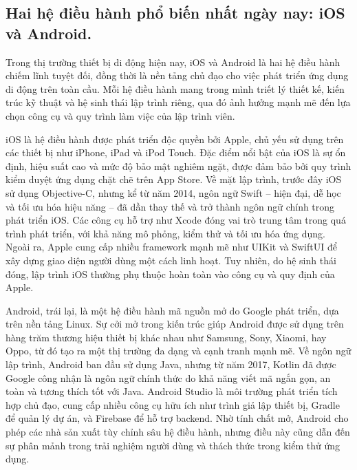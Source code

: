 \subsection{Hai hệ điều hành phổ biến nhất ngày nay: iOS và Android.}
\renewcommand{\labelitemi}{--}   
\begin{flushleft}
  \hspace*{0.8cm}Trong thị trường thiết bị di động hiện nay, iOS và Android là hai hệ điều hành chiếm lĩnh tuyệt đối, đồng thời là nền tảng chủ đạo cho việc phát triển ứng dụng di động trên toàn cầu. Mỗi hệ điều hành mang trong mình triết lý thiết kế, kiến trúc kỹ thuật và hệ sinh thái lập trình riêng, qua đó ảnh hưởng mạnh mẽ đến lựa chọn công cụ và quy trình làm việc của lập trình viên.
\end{flushleft}
    \begin{flushleft}
        \hspace*{0.8cm}iOS là hệ điều hành được phát triển độc quyền bởi Apple, chủ yếu sử dụng trên các thiết bị như iPhone, iPad và iPod Touch. Đặc điểm nổi bật của iOS là sự ổn định, hiệu suất cao và mức độ bảo mật nghiêm ngặt, được đảm bảo bởi quy trình kiểm duyệt ứng dụng chặt chẽ trên App Store. Về mặt lập trình, trước đây iOS sử dụng Objective-C, nhưng kể từ năm 2014, ngôn ngữ Swift – hiện đại, dễ học và tối ưu hóa hiệu năng – đã dần thay thế và trở thành ngôn ngữ chính trong phát triển iOS. Các công cụ hỗ trợ như Xcode đóng vai trò trung tâm trong quá trình phát triển, với khả năng mô phỏng, kiểm thử và tối ưu hóa ứng dụng. Ngoài ra, Apple cung cấp nhiều framework mạnh mẽ như UIKit và SwiftUI để xây dựng giao diện người dùng một cách linh hoạt. Tuy nhiên, do hệ sinh thái đóng, lập trình iOS thường phụ thuộc hoàn toàn vào công cụ và quy định của Apple.
    \end{flushleft}

    \begin{flushleft}
      \hspace*{0.8cm}Android, trái lại, là một hệ điều hành mã nguồn mở do Google phát triển, dựa trên nền tảng Linux. Sự cởi mở trong kiến trúc giúp Android được sử dụng trên hàng trăm thương hiệu thiết bị khác nhau như Samsung, Sony, Xiaomi, hay Oppo, từ đó tạo ra một thị trường đa dạng và cạnh tranh mạnh mẽ. Về ngôn ngữ lập trình, Android ban đầu sử dụng Java, nhưng từ năm 2017, Kotlin đã được Google công nhận là ngôn ngữ chính thức do khả năng viết mã ngắn gọn, an toàn và tương thích tốt với Java. Android Studio là môi trường phát triển tích hợp chủ đạo, cung cấp nhiều công cụ hữu ích như trình giả lập thiết bị, Gradle để quản lý dự án, và Firebase để hỗ trợ backend. Nhờ tính chất mở, Android cho phép các nhà sản xuất tùy chỉnh sâu hệ điều hành, nhưng điều này cũng dẫn đến sự phân mảnh trong trải nghiệm người dùng và thách thức trong kiểm thử ứng dụng.
    \end{flushleft}

